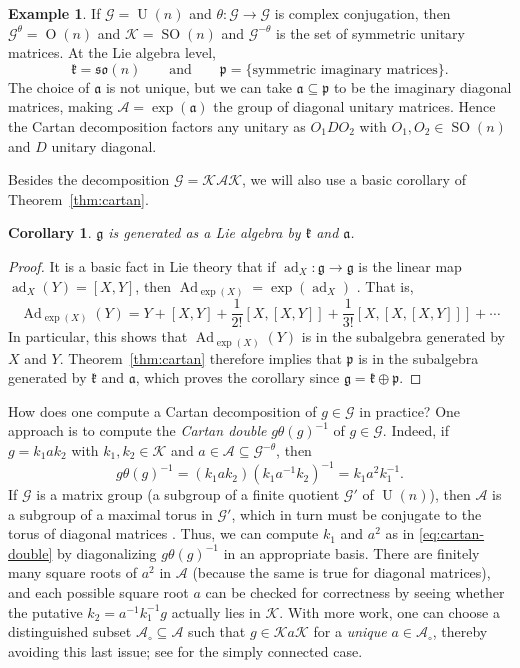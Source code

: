 \documentclass[reqno]{amsart}
\newtheorem{corollary}[theorem]{Corollary}
\theoremstyle{definition} \newtheorem{example}[theorem]{Example}
\newcommand{\U}{\operatorname{U}}
\newcommand{\SO}{\operatorname{SO}}
\renewcommand{\O}{\operatorname{O}}
\newcommand{\so}{\mathfrak{so}}
\DeclareMathOperator{\Ad}{Ad}
\DeclareMathOperator{\ad}{ad}
\newcommand{\secsymbol}{§}
\newcommand{\p}{\mathfrak{p}}
\newcommand{\G}{\mathcal{G}}
\newcommand{\g}{\mathfrak{g}}
\newcommand{\K}{\mathcal{K}}
\renewcommand{\k}{\mathfrak{k}}
\newcommand{\A}{\mathcal{A}}
\renewcommand{\a}{\mathfrak{a}}
\begin{document}
\begin{example} \label{ex:SU-conj}
If $\G = \U(n)$ and $\theta : \G \to \G$ is complex conjugation, then $\G^\theta = \O(n)$ and $\K = \SO(n)$ and $\G^{-\theta}$ is the set of symmetric unitary matrices.  At the Lie algebra level,
\begin{equation*}
\k = \so(n) \qquad \text{and} \qquad \p = \{\text{symmetric imaginary matrices}\}.
\end{equation*}
The choice of $\a$ is not unique, but we can take $\a \subseteq \p$ to be the imaginary diagonal matrices, making $\A = \exp(\a)$ the group of diagonal unitary matrices.  Hence the Cartan decomposition factors any unitary as $O_1 D O_2$ with $O_1,O_2 \in \SO(n)$ and $D$ unitary diagonal.
\end{example}

Besides the decomposition $\G = \K\A\K$, we will also use a basic corollary of Theorem~\ref{thm:cartan}.
\begin{corollary} \label{cor:ka}
$\g$ is generated as a Lie algebra by $\k$ and $\a$.
\end{corollary}

\begin{proof}
It is a basic fact in Lie theory that if $\ad_X : \g \to \g$ is the linear map $\ad_X(Y) = [X,Y]$, then $\Ad_{\exp(X)} = \exp(\ad_X)$ \cite[Ch.\ II, \secsymbol 5]{helgason}. That is,
\begin{equation*}
\Ad_{\exp(X)}(Y) = Y + [X,Y] + \frac{1}{2!}[X,[X,Y]] + \frac{1}{3!}[X,[X,[X,Y]]] + \cdots
\end{equation*}
In particular, this shows that $\Ad_{\exp(X)}(Y)$ is in the subalgebra generated by $X$ and $Y$. Theorem~\ref{thm:cartan} therefore implies that $\p$ is in the subalgebra generated by $\k$ and $\a$, which proves the corollary since $\g = \k \oplus \p$.
\end{proof}

How does one compute a Cartan decomposition of $g \in \G$ in practice? One approach is to compute the \emph{Cartan double} $g\theta(g)^{-1}$ of $g \in \G$. Indeed, if $g = k_1 a k_2$ with $k_1, k_2 \in \K$ and $a \in \A \subseteq \G^{-\theta}$, then
\begin{equation} \label{eq:cartan-double}
g\theta(g)^{-1} = (k_1 a k_2)(k_1 a^{-1} k_2)^{-1} = k_1 a^2 k_1^{-1}.
\end{equation}
If $\G$ is a matrix group (a subgroup of a finite quotient $\G'$ of $\U(n)$), then $\A$ is a subgroup of a maximal torus in $\G'$, which in turn must be conjugate to the torus of diagonal matrices \cite[\secsymbol 16.4]{humphreys}. Thus, we can compute $k_1$ and $a^2$ as in \eqref{eq:cartan-double} by diagonalizing $g\theta(g)^{-1}$ in an appropriate basis. There are finitely many square roots of $a^2$ in $\A$ (because the same is true for diagonal matrices), and each possible square root $a$ can be checked for correctness by seeing whether the putative $k_2 = a^{-1} k_1^{-1} g$ actually lies in $\mathcal{K}$.  With more work, one can choose a distinguished subset $\A_\circ \subseteq \A$ such that $g \in \K a \K$ for a \emph{unique} $a \in \A_\circ$, thereby avoiding this last issue; see \cite[Ch.\ VII, Theorem 8.6]{helgason} for the simply connected case.
\end{document}
